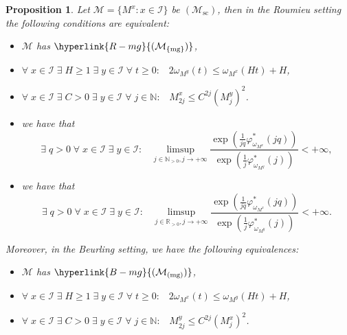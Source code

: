 \documentclass[10pt]{amsart}%
\numberwithin{equation}{section}
\theoremstyle{plain}
\newtheorem{proposition}{Proposition}[section]
\newcommand{\RR}{\mathbb{R}}
\newcommand{\NN}{\mathbb{N}}
\let\on=\operatorname
\begin{document}
\begin{proposition}\label{firstmg}
Let $\mathcal{M}=\{M^x: x\in\mathcal{I}\}$ be \hyperlink{Msc}{$(\mathcal{M}_{\on{sc}})$}, then in the Roumieu setting the following conditions are equivalent:
\begin{itemize}

\item[$(i)$] $\mathcal{M}$ has $\hyperlink{R-mg}{(\mathcal{M}_{\{\on{mg}\}})}$,

\item[$(ii)$] $\forall\;x\in\mathcal{I}\;\exists\;H\ge 1\;\exists\;y\in\mathcal{I}\;\forall\;t\ge 0:\;\;\; 2\omega_{M^y}(t)\le\omega_{M^x}(Ht)+H$,

\item[$(iii)$] $\forall\;x\in\mathcal{I}\;\exists\;C>0\;\exists\;y\in\mathcal{I}\;\forall\;j\in\NN:\;\;\; M^x_{2j}\le C^{2j}(M^y_j)^2$.

 \item[$(iv)$] we have that
 \begin{equation}\label{mgnewroum}
 \exists\;q>0\;\forall\;x\in\mathcal{I}\;\exists\;y\in\mathcal{I}:\;\;\;\limsup_{j\in\NN_{>0},j\rightarrow+\infty}\frac{\exp(\frac{1}{jq}\varphi^{*}_{\omega_{M^x}}(jq))}{\exp(\frac{1}{j}\varphi^{*}_{\omega_{M^y}}(j))}<+\infty,
 \end{equation}

\item[$(v)$] we have that
 \begin{equation}\label{mgnewroumreal}
 \exists\;q>0\;\forall\;x\in\mathcal{I}\;\exists\;y\in\mathcal{I}:\;\;\;\limsup_{j\in\RR_{>0},j\rightarrow+\infty}\frac{\exp(\frac{1}{jq}\varphi^{*}_{\omega_{M^x}}(jq))}{\exp(\frac{1}{j}\varphi^{*}_{\omega_{M^y}}(j))}<+\infty.
 \end{equation}

\end{itemize}

Moreover, in the Beurling setting, we have the following equivalences:
\begin{itemize}

\item[$(i)$] $\mathcal{M}$ has $\hyperlink{B-mg}{(\mathcal{M}_{(\on{mg})})}$,

\item[$(ii)$] $\forall\;x\in\mathcal{I}\;\exists\;H\ge 1\;\exists\;y\in\mathcal{I}\;\forall\;t\ge 0:\;\;\; 2\omega_{M^x}(t)\le\omega_{M^y}(Ht)+H$,

\item[$(iii)$] $\forall\;x\in\mathcal{I}\;\exists\;C>0\;\exists\;y\in\mathcal{I}\;\forall\;j\in\NN:\;\;\; M^y_{2j}\le C^{2j}(M^x_j)^2$.


\end{itemize}
\end{proposition}
\end{document}
